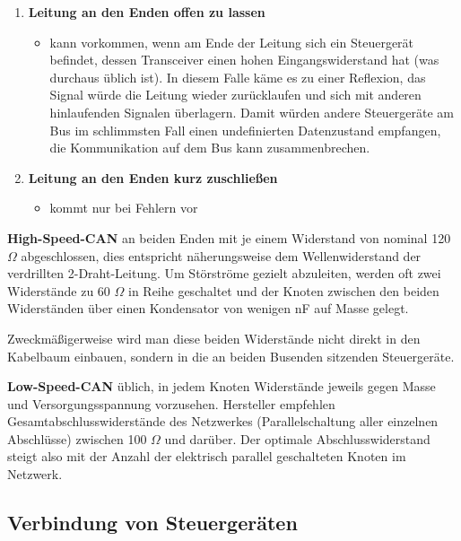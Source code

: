 \begin{enumerate}
\item
  \textbf{Leitung an den Enden offen zu lassen}

  \begin{itemize}
  \item
    kann vorkommen, wenn am Ende der Leitung sich ein Steuergerät
    befindet, dessen Transceiver einen hohen Eingangswiderstand hat (was
    durchaus üblich ist). In diesem Falle käme es zu einer Reflexion,
    das Signal würde die Leitung wieder zurücklaufen und sich mit
    anderen hinlaufenden Signalen überlagern. Damit würden andere
    Steuergeräte am Bus im schlimmsten Fall einen undefinierten
    Datenzustand empfangen, die Kommunikation auf dem Bus kann
    zusammenbrechen.
  \end{itemize}
\item
  \textbf{Leitung an den Enden kurz zuschließen}

  \begin{itemize}
  \item
    kommt nur bei Fehlern vor
  \end{itemize}
\end{enumerate}

\textbf{High-Speed-CAN} an beiden Enden mit je einem Widerstand von
nominal 120 $\Omega$ abgeschlossen, dies entspricht näherungsweise dem
Wellenwiderstand der verdrillten 2-Draht-Leitung. Um Störströme gezielt
abzuleiten, werden oft zwei Widerstände zu 60 $\Omega$ in Reihe
geschaltet und der Knoten zwischen den beiden Widerständen über einen
Kondensator von wenigen nF auf Masse gelegt.

Zweckmäßigerweise wird man diese beiden Widerstände nicht direkt in den
Kabelbaum einbauen, sondern in die an beiden Busenden sitzenden
Steuergeräte.

\textbf{Low-Speed-CAN} üblich, in jedem Knoten Widerstände jeweils gegen
Masse und Versorgungsspannung vorzusehen. Hersteller empfehlen
Gesamtabschlusswiderstände des Netzwerkes (Parallelschaltung aller
einzelnen Abschlüsse) zwischen 100 $\Omega$ und darüber. Der optimale
Abschlusswiderstand steigt also mit der Anzahl der elektrisch parallel
geschalteten Knoten im Netzwerk.

\newpage

\subsection{Verbindung von
Steuergeräten}\label{verbindung-von-steuergeraeten}

